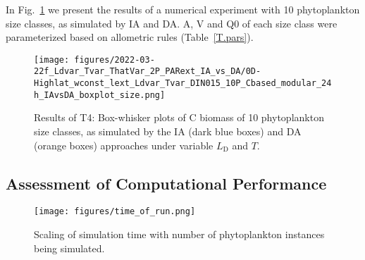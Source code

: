 \documentclass[gmd, manuscript]{copernicus}
\newcommand{\onur}[1]{\textcolor{blue}{\{Onur: #1\}}}
\begin{document}
In Fig.~\ref{f.T3res} we present the results of a numerical experiment with 10 phytoplankton size classes, as simulated by IA and DA. A, V and Q0 of each size class were parameterized based on allometric rules (Table~\ref{T.pars}).

\begin{figure}[ht!]
\texttt{[image: figures/2022-03-22f\_Ldvar\_Tvar\_ThatVar\_2P\_PARext\_IA\_vs\_DA/0D-Highlat\_wconst\_lext\_Ldvar\_Tvar\_DIN015\_10P\_Cbased\_modular\_24h\_IAvsDA\_boxplot\_size.png]}
\caption{Results of T4: Box-whisker plots of C biomass of 10 phytoplankton size classes, as simulated by the IA (dark blue boxes) and DA (orange boxes) approaches under variable $L_{\text{D}}$ and $T$.\label{f.T3res}}
\end{figure}

\subsection{Assessment of Computational Performance}
\begin{figure}[ht!]
\texttt{[image: figures/time\_of\_run.png]}
\caption{Scaling of simulation time with number of phytoplankton instances being simulated.\label{f.speed}}
\end{figure}

\end{document}
